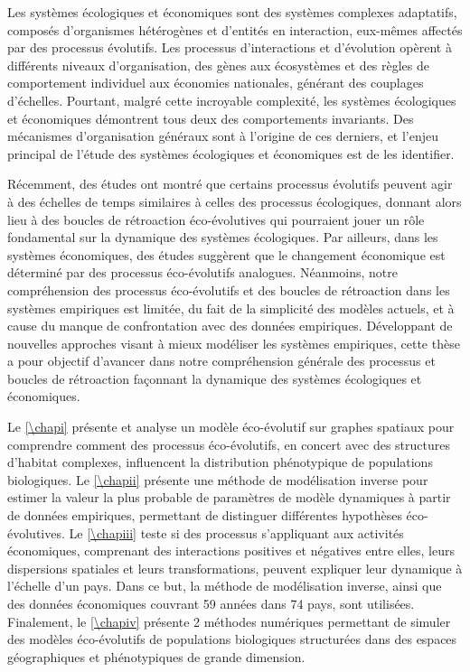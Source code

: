 \small{
\noindent Les systèmes écologiques et économiques sont des systèmes complexes adaptatifs, composés d'organismes hétérogènes et d'entités en interaction, eux-mêmes affectés par des processus évolutifs. Les processus d'interactions et d'évolution opèrent à différents niveaux d'organisation, des gènes aux écosystèmes et des règles de comportement individuel aux économies nationales, générant des couplages d'échelles. Pourtant, malgré cette incroyable complexité, les systèmes écologiques et économiques démontrent tous deux des comportements invariants. Des mécanismes d'organisation généraux sont à l'origine de ces derniers, et l'enjeu principal de l'étude des systèmes écologiques et économiques est de les identifier.
 
Récemment, des études ont montré que certains processus évolutifs peuvent agir à des échelles de temps similaires à celles des processus écologiques, donnant alors lieu à des boucles de rétroaction éco-évolutives qui pourraient jouer un rôle fondamental sur la dynamique des systèmes écologiques. Par ailleurs, dans les systèmes économiques, des études suggèrent que le changement économique est déterminé par des processus éco-évolutifs analogues. Néanmoins, notre compréhension des processus éco-évolutifs et des boucles de rétroaction dans les systèmes empiriques est limitée, du fait de la simplicité des modèles actuels, et à cause du manque de confrontation avec des données empiriques.  Développant de nouvelles approches visant à mieux modéliser les systèmes empiriques, cette thèse a pour objectif d'avancer dans notre compréhension générale des processus et boucles de rétroaction façonnant la dynamique des systèmes écologiques et économiques.
 
Le \cref{\chapi} présente et analyse un modèle éco-évolutif sur graphes spatiaux pour comprendre comment des processus éco-évolutifs, en concert avec des structures d'habitat complexes, influencent la distribution phénotypique de populations biologiques. Le \cref{\chapii} présente une méthode de modélisation inverse pour estimer la valeur la plus probable de paramètres de modèle dynamiques à partir de données empiriques, permettant de distinguer différentes hypothèses éco-évolutives. Le \cref{\chapiii} teste si des processus s'appliquant aux activités économiques, comprenant des interactions positives et négatives entre elles, leurs dispersions spatiales et leurs transformations, peuvent expliquer leur dynamique à l'échelle d'un pays. Dans ce but, la méthode de modélisation inverse, ainsi que des données économiques couvrant 59 années dans 74 pays, sont utilisées. Finalement, le \cref{\chapiv} présente 2 méthodes numériques permettant de simuler des modèles éco-évolutifs de populations biologiques structurées dans des espaces géographiques et phénotypiques de grande dimension.
 
}
